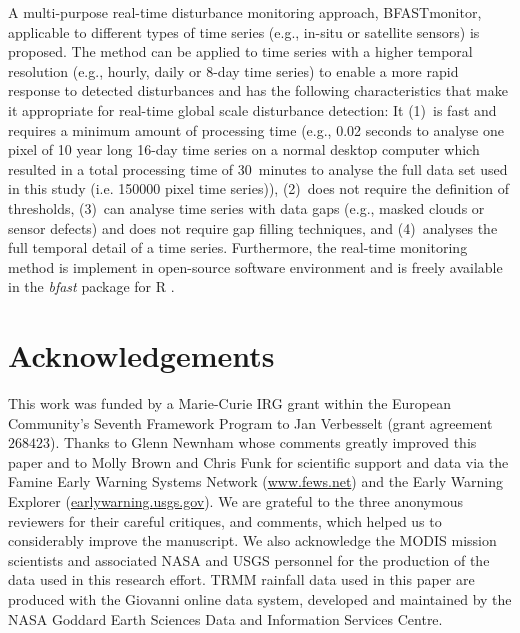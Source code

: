 \documentclass[authoryear,preprint,review,10pt]{elsarticle}
\begin{document}
A multi-purpose real-time disturbance monitoring approach, BFASTmonitor, applicable to different types of time series (e.g., in-situ or satellite sensors) is proposed. The method can be applied to time series with a higher temporal resolution (e.g., hourly, daily or 8-day time series) to enable a more rapid response to detected disturbances and has the following characteristics that make it appropriate for real-time global scale disturbance detection: 
It (1)~is fast and requires a minimum amount of processing time (e.g., 0.02 seconds to analyse one pixel of 10 year long 16-day time series on a normal desktop computer which resulted in a total processing time of 30~minutes to analyse the full data set used in this study (i.e. 150000 pixel time series)),
(2)~does not require the definition of thresholds, (3)~can analyse time series with data gaps (e.g., masked clouds or sensor defects) and does not require gap filling techniques, and (4)~analyses the full temporal detail of a time series. Furthermore, the real-time monitoring method is implement in open-source software environment and is freely available in the \emph{bfast} package for {R} \citep{R}.

%



\section{Acknowledgements}

This work was funded by a Marie-Curie IRG grant within the European Community's Seventh Framework Program to Jan Verbesselt (grant agreement $268423$). Thanks to Glenn Newnham whose comments greatly improved this paper and to Molly Brown and Chris Funk for scientific support and data via the Famine Early Warning Systems Network (\url{www.fews.net}) and the Early Warning Explorer (\url{earlywarning.usgs.gov}). We are grateful to the three anonymous reviewers for their careful critiques, and comments, which helped us to considerably improve the manuscript. We also acknowledge the MODIS mission scientists and associated NASA and USGS personnel for the production of the data used in this research effort. TRMM rainfall data used in this paper are produced with the Giovanni online data system, developed and maintained by the NASA Goddard Earth Sciences Data and Information Services Centre.
\end{document}
